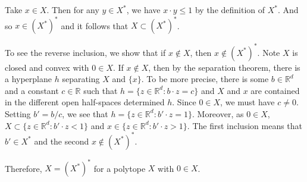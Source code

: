 \documentclass[12pt,reqno]{amsart}
\theoremstyle{definition}
\newcommand{\RR}{\mathbb{R}}
\newcommand{\conv}[1]{\mathrm{conv}(#1)}
\begin{document}

Take $x\in X$. Then for any $y\in X^*$, we have $x\cdot y \leq 1$ by the definition of $X^*$. And so $x\in (X^*)^*$ and it follows that $X\subset (X^*)^*$.

To see the reverse inclusion, we show that if $x\notin X$, then $x\notin (X^*)^*$. Note $X$ is closed and convex with $0\in X$. If $x\notin X$, then by the separation theorem, there is a hyperplane $h$ separating $X$ and $\{x\}$. To be more precise, there is some $b\in \RR^d$ and a constant $c\in \RR$ such that $h=\{z\in \RR^d: b\cdot z =c\}$ and $X$ and $x$ are contained in the different open half-spaces determined $h$. Since $0\in X$, we must have $c\not=0$. Setting $b'=b/c$, we see that $h=\{z\in \RR^d: b'\cdot z =1\}$. Moreover, as $0\in X$,  $X\subset \{z\in \RR^d: b'\cdot z < 1\}$ and $x\in \{z\in \RR^d: b'\cdot z > 1\}$. The first inclusion means that $b'\in X^{*}$ and the second $x\notin (X^*)^*$.


Therefore, $X=(X^*)^*$ for a polytope $X$ with $0\in X$.




% 

\newpage
\end{document}

